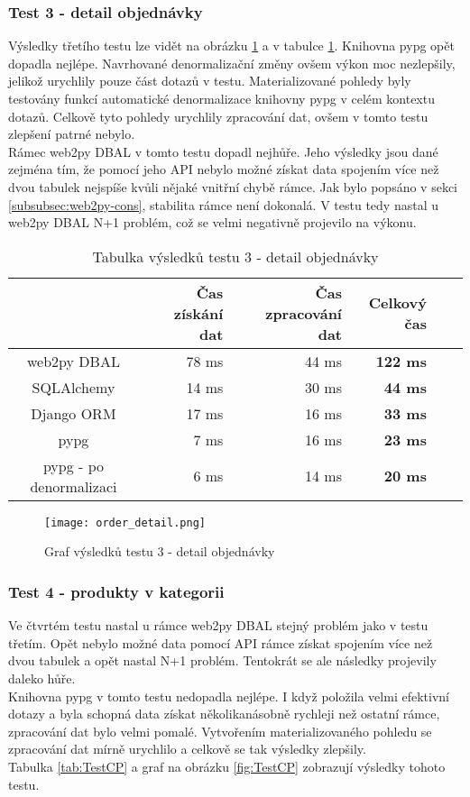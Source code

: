 \documentclass[ing,male,java,dept456]{diploma}						%
\begin{document}
\subsubsection{Test 3 - detail objednávky}
Výsledky třetího testu lze vidět na obrázku \ref{fig:TestOD} a v tabulce \ref{tab:TestOD}. Knihovna pypg opět dopadla nejlépe. Navrhované denormalizační změny ovšem výkon moc nezlepšily, jelikož urychlily pouze část dotazů v testu. Materializované pohledy byly testovány funkcí automatické denormalizace knihovny pypg v celém kontextu dotazů. Celkově tyto pohledy urychlily zpracování dat, ovšem v tomto testu zlepšení patrné nebylo. \\
Rámec web2py DBAL v tomto testu dopadl nejhůře. Jeho výsledky jsou dané zejména tím, že pomocí jeho API nebylo možné získat data spojením více než dvou tabulek nejspíše kvůli nějaké vnitřní chybě rámce. Jak bylo popsáno v sekci \ref{subsubsec:web2py-cons}, stabilita rámce není dokonalá. V testu tedy nastal u web2py DBAL N+1 problém, což se velmi negativně projevilo na výkonu.

\begin{table}[h!]
  \centering
  \begin{tabular}{|c|r|r|r|r|r|}
    \hline
    & Čas získání dat & Čas zpracování dat & \textbf{Celkový čas} \\
    \hline
    web2py DBAL & 78 ms & 44 ms & \textbf{122 ms} \\
    \hline
    SQLAlchemy & 14 ms & 30 ms & \textbf{44 ms} \\
    \hline
    Django ORM & 17 ms & 16 ms & \textbf{33 ms} \\
    \hline
    pypg & 7 ms & 16 ms & \textbf{23 ms} \\
    \hline
    pypg - po denormalizaci & 6 ms & 14 ms & \textbf{20 ms} \\
    \hline
  \end{tabular}
  \caption{Tabulka výsledků testu 3 - detail objednávky}
  \label{tab:TestOD}
\end{table}
\begin{figure}[h!]
    \centering
    \texttt{[image: order\_detail.png]}
    \caption{Graf výsledků testu 3 - detail objednávky}
    \label{fig:TestOD}
\end{figure}

\subsubsection{Test 4 - produkty v kategorii}
Ve čtvrtém testu nastal u rámce web2py DBAL stejný problém jako v testu třetím. Opět nebylo možné data pomocí API rámce získat spojením více než dvou tabulek a opět nastal N+1 problém. Tentokrát se ale následky projevily daleko hůře. \\
Knihovna pypg v tomto testu nedopadla nejlépe. I když položila velmi efektivní dotazy a byla schopná data získat několikanásobně rychleji než ostatní rámce, zpracování dat bylo velmi pomalé. Vytvořením materializovaného pohledu se zpracování dat mírně urychlilo a celkově se tak výsledky zlepšily. \\
Tabulka \ref{tab:TestCP} a graf na obrázku \ref{fig:TestCP} zobrazují výsledky tohoto testu.
\end{document}
